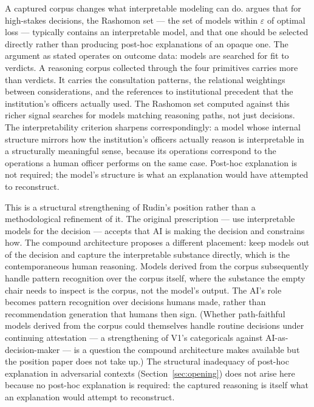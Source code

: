 A captured corpus changes what interpretable modeling can do. \textcite{rudin2019} argues that for high-stakes decisions, the Rashomon set --- the set of models within $\varepsilon$ of optimal loss --- typically contains an interpretable model, and that one should be selected directly rather than producing post-hoc explanations of an opaque one. The argument as stated operates on outcome data: models are searched for fit to verdicts. A reasoning corpus collected through the four primitives carries more than verdicts. It carries the consultation patterns, the relational weightings between considerations, and the references to institutional precedent that the institution's officers actually used. The Rashomon set computed against this richer signal searches for models matching reasoning paths, not just decisions. The interpretability criterion sharpens correspondingly: a model whose internal structure mirrors how the institution's officers actually reason is interpretable in a structurally meaningful sense, because its operations correspond to the operations a human officer performs on the same case. Post-hoc explanation is not required; the model's structure is what an explanation would have attempted to reconstruct.

This is a structural strengthening of Rudin's position rather than a methodological refinement of it. The original prescription --- use interpretable models for the decision --- accepts that AI is making the decision and constrains how. The compound architecture proposes a different placement: keep models out of the decision and capture the interpretable substance directly, which is the contemporaneous human reasoning. Models derived from the corpus subsequently handle pattern recognition over the corpus itself, where the substance the empty chair needs to inspect is the corpus, not the model's output. The AI's role becomes pattern recognition over decisions humans made, rather than recommendation generation that humans then sign. (Whether path-faithful models derived from the corpus could themselves handle routine decisions under continuing attestation --- a strengthening of V1's categoricals against AI-as-decision-maker --- is a question the compound architecture makes available but the position paper does not take up.) The structural inadequacy of post-hoc explanation in adversarial contexts (Section~\ref{sec:opening}) does not arise here because no post-hoc explanation is required: the captured reasoning is itself what an explanation would attempt to reconstruct.

